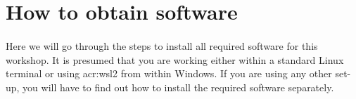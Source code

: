 \section{How to obtain software}
    \paragraph{}
    Here we will go through the steps to install all required software for this workshop. It is presumed that you are working either within a standard Linux terminal or using \gls{acr:wsl2} from within Windows. If you are using any other set-up, you will have to find out how to install the required software separately.




